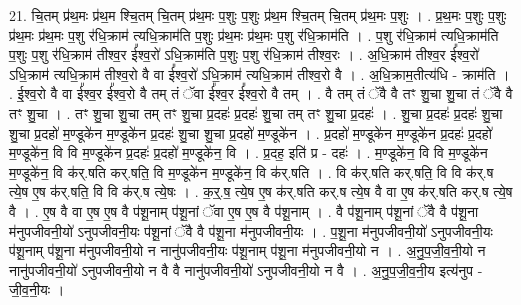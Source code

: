 \documentclass[17pt]{extarticle}
\begin{document}
21. चि॒तम् प्र॑थ॒मः प्र॑थ॒म श्चि॒तम् चि॒तम् प्र॑थ॒मः प॒शुः प॒शुः प्र॑थ॒म श्चि॒तम् चि॒तम् प्र॑थ॒मः प॒शुः । . प्र॒थ॒मः प॒शुः प॒शुः प्र॑थ॒मः प्र॑थ॒मः प॒शु र॑धि॒क्राम॑ त्यधि॒क्राम॑ति प॒शुः प्र॑थ॒मः प्र॑थ॒मः प॒शु र॑धि॒क्राम॑ति । . प॒शु र॑धि॒क्राम॑ त्यधि॒क्राम॑ति प॒शुः प॒शु र॑धि॒क्राम॑ तीश्व॒र ई᳚श्व॒रो॑ ऽधि॒क्राम॑ति प॒शुः प॒शु र॑धि॒क्राम॑ तीश्व॒रः । . अ॒धि॒क्राम॑ तीश्व॒र ई᳚श्व॒रो॑ ऽधि॒क्राम॑ त्यधि॒क्राम॑ तीश्व॒रो वै वा ई᳚श्व॒रो॑ ऽधि॒क्राम॑ त्यधि॒क्राम॑ तीश्व॒रो वै । . अ॒धि॒क्राम॒तीत्य॑धि - क्राम॑ति । . ई॒श्व॒रो वै वा ई᳚श्व॒र ई᳚श्व॒रो वै तम् तं ॅवा ई᳚श्व॒र ई᳚श्व॒रो वै तम् । . वै तम् तं ॅवै वै तꣳ शु॒चा शु॒चा तं ॅवै वै तꣳ शु॒चा । . तꣳ शु॒चा शु॒चा तम् तꣳ शु॒चा प्र॒दहः॑ प्र॒दहः॑ शु॒चा तम् तꣳ शु॒चा प्र॒दहः॑ । . शु॒चा प्र॒दहः॑ प्र॒दहः॑ शु॒चा शु॒चा प्र॒दहो॑ म॒ण्डूके॑न म॒ण्डूके॑न प्र॒दहः॑ शु॒चा शु॒चा प्र॒दहो॑ म॒ण्डूके॑न । . प्र॒दहो॑ म॒ण्डूके॑न म॒ण्डूके॑न प्र॒दहः॑ प्र॒दहो॑ म॒ण्डूके॑न॒ वि वि म॒ण्डूके॑न प्र॒दहः॑ प्र॒दहो॑ म॒ण्डूके॑न॒ वि । . प्र॒दह॒ इति॑ प्र - दहः॑ । . म॒ण्डूके॑न॒ वि वि म॒ण्डूके॑न म॒ण्डूके॑न॒ वि क॑र्.षति कर्.षति॒ वि म॒ण्डूके॑न म॒ण्डूके॑न॒ वि क॑र्.षति । . वि क॑र्.षति कर्.षति॒ वि वि क॑र्.ष त्ये॒ष ए॒ष क॑र्.षति॒ वि वि क॑र्.ष त्ये॒षः । . क॒र्॒.ष॒ त्ये॒ष ए॒ष क॑र्.षति कर्.ष त्ये॒ष वै वा ए॒ष क॑र्.षति कर्.ष त्ये॒ष वै । . ए॒ष वै वा ए॒ष ए॒ष वै प॑शू॒नाम् प॑शू॒नां ॅवा ए॒ष ए॒ष वै प॑शू॒नाम् । . वै प॑शू॒नाम् प॑शू॒नां ॅवै वै प॑शू॒ना म॑नुपजीवनी॒यो॑ ऽनुपजीवनी॒यः प॑शू॒नां ॅवै वै प॑शू॒ना म॑नुपजीवनी॒यः । . प॒शू॒ना म॑नुपजीवनी॒यो॑ ऽनुपजीवनी॒यः प॑शू॒नाम् प॑शू॒ना म॑नुपजीवनी॒यो न नानु॑पजीवनी॒यः प॑शू॒नाम् प॑शू॒ना म॑नुपजीवनी॒यो न । . अ॒नु॒प॒जी॒व॒नी॒यो न नानु॑पजीवनी॒यो॑ ऽनुपजीवनी॒यो न वै वै नानु॑पजीवनी॒यो॑ ऽनुपजीवनी॒यो न वै । . अ॒नु॒प॒जी॒व॒नी॒य इत्य॑नुप - जी॒व॒नी॒यः । \newline
\end{document}
